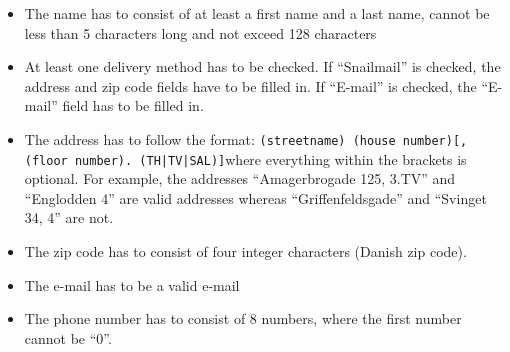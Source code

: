 		\begin{itemize}
			\item The name has to consist of at least a first name and a last name, cannot be less than 5 characters long and not exceed 128 characters
			\item At least one delivery method has to be checked. If “Snailmail” is checked, the address and zip code fields have to be filled in. If “E-mail” is checked, the “E-mail” field has to be filled in.
			\item The address has to follow the format: \newline\newline \texttt{(streetname) (house number)[, (floor number). (TH|TV|SAL)]}\newline\newline where everything within the brackets is optional. For example, the addresses ``Amagerbrogade 125, 3.TV'' and ``Englodden 4'' are valid addresses whereas ``Griffenfeldsgade'' and ``Svinget 34, 4'' are not.
			\item The zip code has to consist of four integer characters (Danish zip code).
			\item The e-mail has to be a valid e-mail
			\item The phone number has to consist of 8 numbers, where the first number cannot be “0”.
		\end{itemize}



			

